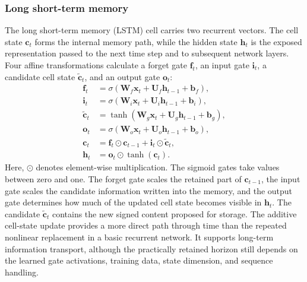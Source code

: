 \documentclass[
    a4paper,
    12pt,
    titlepage,
    bibliography=totoc,
    twoside=on,
    parskip=false,
    numbers=noenddot,
    cleardoublepage=empty,
    DIV=12,
    BCOR=12.0mm,
    headheight=36pt,
    headings=openright
]{scrreprt}
\begin{document}
\subsubsection{Long short-term memory}
The long short-term memory (LSTM) cell carries two recurrent vectors. The cell state $\mathbf{c}_t$ forms the internal memory path, while the hidden state $\mathbf{h}_t$ is the exposed representation passed to the next time step and to subsequent network layers. Four affine transformations calculate a forget gate $\mathbf{f}_t$, an input gate $\mathbf{i}_t$, a candidate cell state $\tilde{\mathbf{c}}_t$, and an output gate $\mathbf{o}_t$:
\begin{equation}
    \begin{aligned}
        \mathbf{f}_t
        &=
        \sigma\!\left(
        \mathbf{W}_f\mathbf{x}_t+
        \mathbf{U}_f\mathbf{h}_{t-1}+
        \mathbf{b}_f\right),\\
        \mathbf{i}_t
        &=
        \sigma\!\left(
        \mathbf{W}_i\mathbf{x}_t+
        \mathbf{U}_i\mathbf{h}_{t-1}+
        \mathbf{b}_i\right),\\
        \tilde{\mathbf{c}}_t
        &=
        \tanh\!\left(
        \mathbf{W}_g\mathbf{x}_t+
        \mathbf{U}_g\mathbf{h}_{t-1}+
        \mathbf{b}_g\right),\\
        \mathbf{o}_t
        &=
        \sigma\!\left(
        \mathbf{W}_o\mathbf{x}_t+
        \mathbf{U}_o\mathbf{h}_{t-1}+
        \mathbf{b}_o\right),\\
        \mathbf{c}_t
        &=
        \mathbf{f}_t\odot\mathbf{c}_{t-1}
        +\mathbf{i}_t\odot\tilde{\mathbf{c}}_t,\\
        \mathbf{h}_t
        &=
        \mathbf{o}_t\odot\tanh(\mathbf{c}_t).
    \end{aligned}
    \label{eq:fundamental_lstm}
\end{equation}
Here, $\odot$ denotes element-wise multiplication. The sigmoid gates take values between zero and one. The forget gate scales the retained part of $\mathbf{c}_{t-1}$, the input gate scales the candidate information written into the memory, and the output gate determines how much of the updated cell state becomes visible in $\mathbf{h}_t$. The candidate $\tilde{\mathbf{c}}_t$ contains the new signed content proposed for storage. The additive cell-state update provides a more direct path through time than the repeated nonlinear replacement in a basic recurrent network. It supports long-term information transport, although the practically retained horizon still depends on the learned gate activations, training data, state dimension, and sequence handling.
\end{document}
